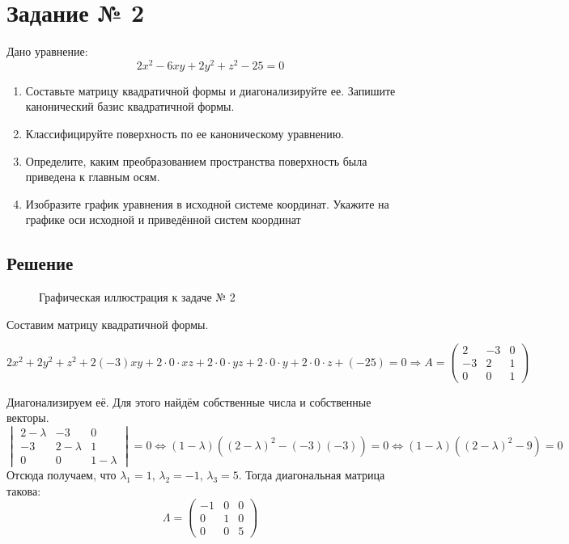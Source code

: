 \section{Задание № 2}

Дано уравнение:
\[2x^2 - 6xy + 2y^2 + z^2 - 25 = 0\]

\begin{enumerate}
  \item Составьте матрицу квадратичной формы и диагонализируйте ее.
    Запишите канонический базис квадратичной формы.
  \item Классифицируйте поверхность по ее каноническому уравнению.
  \item Определите, каким преобразованием пространства поверхность была
    приведена к главным осям.
  \item Изобразите график уравнения в исходной системе координат.
    Укажите на графике оси исходной и приведённой систем координат
\end{enumerate}

\subsection{Решение}

\begin{figure}[htbp]
  \centering
  \caption{Графическая иллюстрация к задаче № 2} \label{fig:2}
\end{figure}


Составим матрицу квадратичной формы.

\[
  2x^2 + 2y^2 + z^2
  + 2 (-3) xy + 2 \cdot 0 \cdot xz + 2 \cdot 0 \cdot yz
  + 2 \cdot 0 \cdot y + 2 \cdot 0 \cdot z + (-25) = 0
  \Rightarrow
  A =
  \begin{pmatrix}
    2 & -3 & 0 \\
    -3 & 2 & 1 \\
    0 & 0 & 1
  \end{pmatrix}
\]

Диагонализируем её. Для этого найдём собственные числа
и собственные векторы.
\[
  \begin{vmatrix}
    2 - λ & -3 & 0 \\
    -3 & 2 - λ & 1 \\
    0 & 0 & 1 - λ
  \end{vmatrix}
  = 0
  \Leftrightarrow
  (1 - λ) ({(2 - λ)}^2 - (-3) (-3)) = 0
  \Leftrightarrow
  (1 - λ) ({(2 - λ)}^2 - 9) = 0
\]
Отсюда получаем, что
\(λ_1 = 1\),
\(λ_2 = -1\),
\(λ_3 = 5\).
Тогда диагональная матрица такова:
\[
  Λ =
  \begin{pmatrix}
    -1 & 0 & 0 \\
    0 & 1 & 0 \\
    0 & 0 & 5
  \end{pmatrix}
\]

